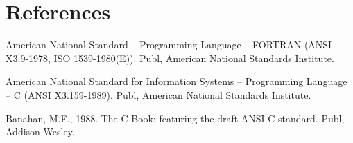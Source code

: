 \documentclass[twoside,11pt,nolof]{starlink}
\begin{document}
\section{References}
\nocite{fortran:std}
\nocite{c:std}
\nocite{Banahan}
\begin{thebibliography}{9}

American National Standard -- Programming Language
-- FORTRAN (ANSI X3.9-1978, ISO 1539-1980(E)). Publ, American National
Standards Institute.

American National Standard for Information Systems --
Programming Language -- C (ANSI X3.159-1989). Publ, American National
Standards Institute.


Banahan, M.F., 1988. The C Book: featuring the draft ANSI C
standard. Publ, Addison-Wesley.

\end{thebibliography}
\end{document}
